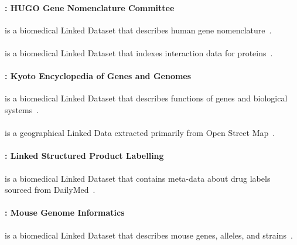 \paragraph{\hgnc: HUGO Gene Nomenclature Committee} is a biomedical Linked Dataset that describes human gene nomenclature~\cite{DumontierCCAEBD14}.

\paragraph{\irefindex} is a biomedical Linked Dataset that indexes interaction data for proteins~\cite{DumontierCCAEBD14}.

\paragraph{\kegg: Kyoto Encyclopedia of Genes and Genomes} is a biomedical Linked Dataset that describes functions of genes and biological systems~\cite{DumontierCCAEBD14}.

\paragraph{\linkedgeodata} is a geographical Linked Data extracted primarily from Open Street Map~\cite{StadlerLHA12}.

\paragraph{\linkedspl: Linked Structured Product Labelling} is a biomedical Linked Dataset that contains meta-data about drug labels sourced from DailyMed~\cite{DumontierCCAEBD14}.



\paragraph{\mgi: Mouse Genome Informatics} is a biomedical Linked Dataset that describes mouse genes, alleles, and strains~\cite{DumontierCCAEBD14}.

